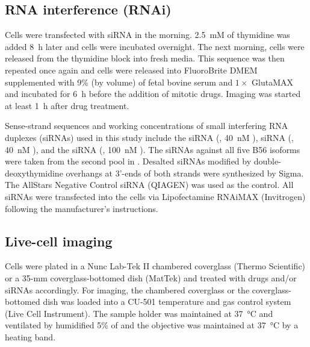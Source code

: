 \subsection{RNA interference (RNAi)}

Cells were transfected with siRNA in the morning. \SI{2.5}{mM} of thymidine was added \SI{8}{h} later and cells were incubated overnight. The next morning, cells were released from the thymidine block into fresh media. This sequence was then repeated once again and cells were released into FluoroBrite\texttrademark{} DMEM supplemented with 9\% (by volume) of fetal bovine serum and $1\times$ GlutaMAX and incubated for \SI{6}{h} before the addition of mitotic drugs. Imaging was started at least \SI{1}{h} after drug treatment.

Sense-strand sequences and working concentrations of small interfering RNA duplexes (siRNAs) used in this study include the  siRNA (, \SI{40}{nM} \cite{BubR1MitosisTurnover}),  siRNA (, \SI{40}{nM} \cite{BUB1-si5}), and the  siRNA (, \SI{100}{nM} \cite{BUBR1_XenopusVSHeLa}). The siRNAs against all five B56 isoforms were taken from the second pool in \cite{siB56s}.
Desalted siRNAs modified by double-deoxythymidine overhangs at 3'-ends of both strands were synthesized by Sigma. The AllStars Negative Control siRNA (QIAGEN) was used as the control. All siRNAs were transfected into the cells via Lipofectamine RNAiMAX (Invitrogen) following the manufacturer’s instructions.

\subsection{Live-cell imaging}
\label{chpt3ImagingMethods}

Cells were plated in a Nunc Lab-Tek II chambered coverglass (Thermo Scientific) or a 35-mm coverglass-bottomed dish (MatTek) and treated with drugs and/or siRNAs accordingly. For imaging, the chambered coverglass or the coverglass-bottomed dish was loaded into a CU-501 temperature and gas control system (Live Cell Instrument). The sample holder was maintained at \SI{37}{\celsius} and ventilated by humidified 5\% of  and the objective was maintained at \SI{37}{\celsius} by a heating band.

